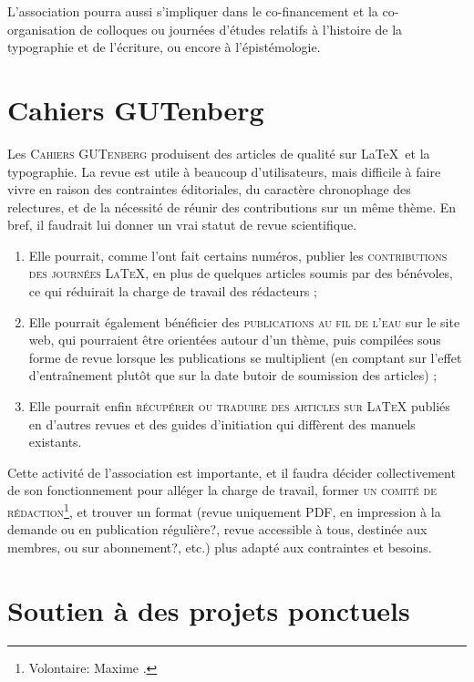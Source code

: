 \documentclass{tufte-handout}
\newcommand{\ratio}[3][]{\marginpar{\footnotesize{\textcolor{teal}{Temps requis: #2 / Utilité: #3}\par\noindent \textcolor{teal}{#1}}}}
\begin{document}
L’association pourra aussi s’impliquer dans le co-financement et la co-organisation de colloques ou journées d’études relatifs à l’histoire de la typographie et de l’écriture, ou encore à l’épistémologie.


\section{Cahiers GUTenberg}

Les \textsc{Cahiers GUTenberg}\ratio[Chronophage, mais utile à la communauté et susceptible de bénéficier des autres projets]{++}{+++} produisent des articles de qualité sur \LaTeX\ et la typographie. La revue est utile à beaucoup d'utilisateurs, mais difficile à faire vivre en raison des contraintes éditoriales, du caractère chronophage des relectures, et de la nécessité de réunir des contributions sur un même thème. En bref, il faudrait lui donner un vrai statut de revue scientifique.

\begin{enumerate}
	\item Elle pourrait, comme l'ont fait certains numéros, publier les \textsc{contributions des journées \LaTeX}, en plus de quelques articles soumis par des bénévoles, ce qui réduirait la charge de travail des rédacteurs ;
	\item Elle pourrait également bénéficier des \textsc{publications au fil de l'eau} sur le site web, qui pourraient être orientées autour d'un thème, puis compilées sous forme de revue lorsque les publications se multiplient (en comptant sur l'effet d'entraînement plutôt que sur la date butoir de soumission des articles) ;
	\item Elle pourrait enfin \textsc{récupérer ou traduire des articles sur \LaTeX} publiés en d'autres revues et des guides d'initiation qui diffèrent des manuels existants.
\end{enumerate}

Cette activité de l'association est importante, et il faudra décider collectivement de son fonctionnement pour alléger la charge de travail, former \textsc{un comité de rédaction}\footnote{Volontaire: Maxime .}, et trouver un format (revue uniquement PDF, en impression à la demande ou en publication régulière?, revue accessible à tous, destinée aux membres, ou sur abonnement?, etc.) plus adapté aux contraintes et besoins.


\section{Soutien à des projets ponctuels}
\end{document}

